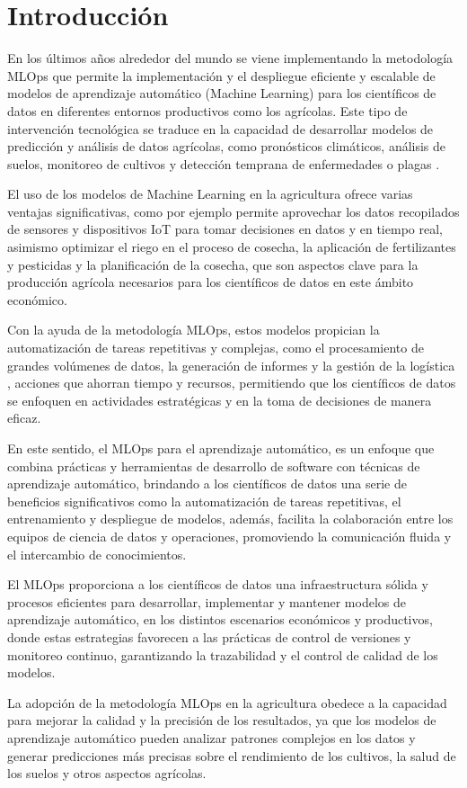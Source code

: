\section{Introducción}

En los últimos años alrededor del mundo se viene implementando la metodología MLOps que permite la implementación y el despliegue eficiente y escalable de modelos de aprendizaje automático (Machine Learning) para los científicos de datos en diferentes entornos productivos como los agrícolas. Este tipo de intervención tecnológica se traduce en la capacidad de desarrollar modelos de predicción y análisis de datos agrícolas, como pronósticos climáticos, análisis de suelos, monitoreo de cultivos y detección temprana de enfermedades o plagas \citep{fao2021}.

El uso de los modelos de Machine Learning en la agricultura ofrece varias ventajas significativas, como por ejemplo permite aprovechar los datos recopilados de sensores y dispositivos IoT para tomar decisiones en datos y en tiempo real, asimismo optimizar el riego en el proceso de cosecha, la aplicación de fertilizantes y pesticidas y la planificación de la cosecha, que son aspectos clave para la producción agrícola necesarios para los científicos de datos en este ámbito económico.

Con la ayuda de la metodología MLOps, estos modelos propician la automatización de tareas repetitivas y complejas, como el procesamiento de grandes volúmenes de datos, la generación de informes y la gestión de la logística \citep{arleyllano2016,monsalve2021}, acciones que ahorran tiempo y recursos, permitiendo que los científicos de datos se enfoquen en actividades estratégicas y en la toma de decisiones de manera eficaz.

En este sentido, el MLOps para el aprendizaje automático, es un enfoque que combina prácticas y herramientas de desarrollo de software con técnicas de aprendizaje automático, brindando a los científicos de datos una serie de beneficios significativos como la automatización de tareas repetitivas, el entrenamiento y despliegue de modelos, además, facilita la colaboración entre los equipos de ciencia de datos y operaciones, promoviendo la comunicación fluida y el intercambio de conocimientos.\newpage

El MLOps proporciona a los científicos de datos una infraestructura sólida y procesos eficientes para desarrollar, implementar y mantener modelos de aprendizaje automático, en los distintos escenarios económicos y productivos, donde estas estrategias favorecen a las prácticas de control de versiones y monitoreo continuo, garantizando la trazabilidad y el control de calidad de los modelos.

La adopción de la metodología MLOps en la agricultura obedece a la capacidad para mejorar la calidad y la precisión de los resultados, ya que los modelos de aprendizaje automático pueden analizar patrones complejos en los datos y generar predicciones más precisas sobre el rendimiento de los cultivos, la salud de los suelos y otros aspectos agrícolas.
